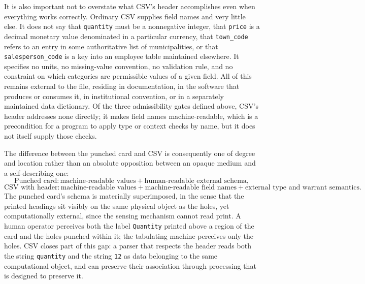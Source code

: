 \documentclass[11pt]{article}
\begin{document}
It is also important not to overstate what CSV's header accomplishes even when everything works correctly. Ordinary CSV supplies field names and very little else. It does not say that \texttt{quantity} must be a nonnegative integer, that \texttt{price} is a decimal monetary value denominated in a particular currency, that \texttt{town\_code} refers to an entry in some authoritative list of municipalities, or that \texttt{salesperson\_code} is a key into an employee table maintained elsewhere. It specifies no units, no missing-value convention, no validation rule, and no constraint on which categories are permissible values of a given field. All of this remains external to the file, residing in documentation, in the software that produces or consumes it, in institutional convention, or in a separately maintained data dictionary. Of the three admissibility gates defined above, CSV's header addresses none directly; it makes field names machine-readable, which is a precondition for a program to apply type or context checks by name, but it does not itself supply those checks.

The difference between the punched card and CSV is consequently one of degree and location rather than an absolute opposition between an opaque medium and a self-describing one:
\[
\text{Punched card} : \text{machine-readable values} + \text{human-readable external schema},
\]
\[
\text{CSV with header} : \text{machine-readable values} + \text{machine-readable field names} + \text{external type and warrant semantics}.
\]
The punched card's schema is materially superimposed, in the sense that the printed headings sit visibly on the same physical object as the holes, yet computationally external, since the sensing mechanism cannot read print. A human operator perceives both the label \texttt{Quantity} printed above a region of the card and the holes punched within it; the tabulating machine perceives only the holes. CSV closes part of this gap: a parser that respects the header reads both the string \texttt{quantity} and the string \texttt{12} as data belonging to the same computational object, and can preserve their association through processing that is designed to preserve it.
\end{document}

